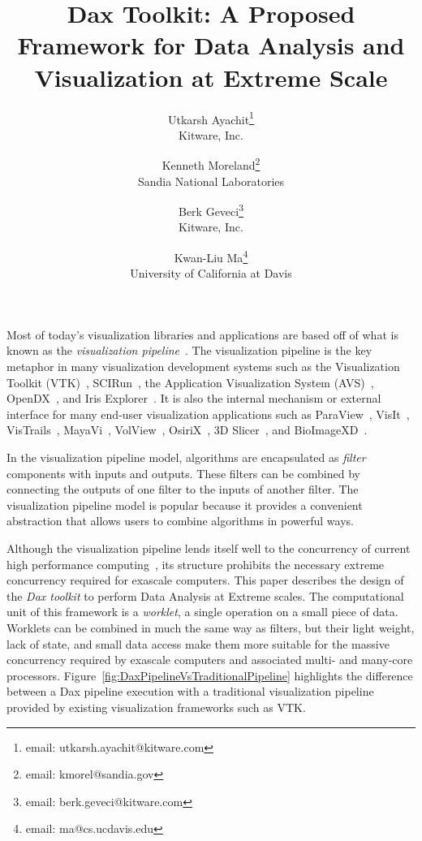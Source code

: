 \documentclass{vgtc}                          %
\title{Dax Toolkit: A Proposed Framework for Data Analysis and Visualization at Extreme Scale}
\author{
  Utkarsh Ayachit\thanks{email: utkarsh.ayachit@kitware.com} \\ %
  \scriptsize Kitware, Inc. %
  \and %
  Kenneth Moreland\thanks{email: kmorel@sandia.gov} \\ %
  \scriptsize Sandia National Laboratories %
  \and %
  Berk Geveci\thanks{email: berk.geveci@kitware.com} \\ %
  \scriptsize Kitware, Inc. %
  \and %
  Kwan-Liu Ma\thanks{email: ma@cs.ucdavis.edu} \\ %
  \scriptsize University of California at Davis %
}
\newcommand*{\lcite}[1]{~\cite{#1}}
\newcommand*{\keyterm}[1]{\emph{#1}}
\begin{document}


\maketitle

\label{sec:Introduction}

Most of today's visualization libraries and applications are based off of
what is known as the \keyterm{visualization
  pipeline}\lcite{Haeberli88,Lucas92}.  The visualization pipeline is the
key metaphor in many visualization development systems such as the
Visualization Toolkit (VTK)\lcite{VTKBook}, SCIRun\lcite{SCIRunPaper}, the
Application Visualization System (AVS)\lcite{AVSPaper},
OpenDX\lcite{OpenDXPaper}, and Iris Explorer\lcite{IRISExplorerPaper}.  It
is also the internal mechanism or external interface for many end-user
visualization applications such as ParaView\lcite{ParaViewGuideBook},
VisIt\lcite{VisItBook}, VisTrails\lcite{VisTrailsPaper},
MayaVi\lcite{MayaViPaper}, VolView\lcite{VolViewBook},
OsiriX\lcite{OsiriXPaper}, 3D Slicer\lcite{3DSlicerPaper}, and
BioImageXD\lcite{BioImageXDPaper}.

In the visualization pipeline model, algorithms are encapsulated as
\keyterm{filter} components with inputs and outputs.  These filters can
be combined by connecting the outputs of one filter to the inputs of
another filter.  The visualization pipeline model is popular because it
provides a convenient abstraction that allows users to combine algorithms
in powerful ways.

Although the visualization pipeline lends itself well to the concurrency of
current high performance
computing\lcite{Moreland08,Patchett09,Pugmire08,White05}, its structure
prohibits the necessary extreme concurrency required for exascale
computers.  This paper describes the design of the \keyterm{Dax toolkit} to
perform Data Analysis at Extreme scales.  The computational unit of this
framework is a \keyterm{worklet}, a single operation on a small piece of data.
Worklets can be combined in much the same way as filters, but their light
weight, lack of state, and small data access make them more suitable for
the massive concurrency required by exascale computers and associated
multi- and many-core processors.
Figure~\ref{fig:DaxPipelineVsTraditionalPipeline} highlights the difference
between a Dax pipeline
execution with a traditional visualization pipeline provided by existing
visualization frameworks such as VTK.
\end{document}
